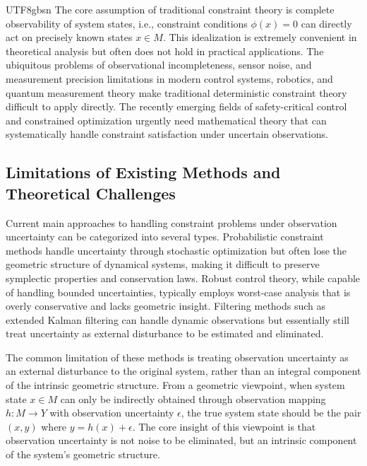 \documentclass[a4paper,12pt]{extarticle}
\theoremstyle{definition}
\begin{document}
\begin{CJK}{UTF8}{gbsn}
The core assumption of traditional constraint theory is complete observability of system states, i.e., constraint conditions $\phi(x) = 0$ can directly act on precisely known states $x \in M$. This idealization is extremely convenient in theoretical analysis but often does not hold in practical applications. The ubiquitous problems of observational incompleteness, sensor noise, and measurement precision limitations in modern control systems\cite{khalil2002nonlinear}, robotics\cite{murray1994mathematical}, and quantum measurement theory\cite{nielsen2000quantum} make traditional deterministic constraint theory difficult to apply directly. The recently emerging fields of safety-critical control\cite{ames2019control} and constrained optimization\cite{nocedal2006numerical} urgently need mathematical theory that can systematically handle constraint satisfaction under uncertain observations.

\subsection{Limitations of Existing Methods and Theoretical Challenges}

Current main approaches to handling constraint problems under observation uncertainty can be categorized into several types. Probabilistic constraint methods\cite{nemirovski2007convex} handle uncertainty through stochastic optimization but often lose the geometric structure of dynamical systems, making it difficult to preserve symplectic properties and conservation laws. Robust control theory\cite{zhou1996robust}, while capable of handling bounded uncertainties, typically employs worst-case analysis that is overly conservative and lacks geometric insight. Filtering methods such as extended Kalman filtering\cite{jazwinski1970stochastic} can handle dynamic observations but essentially still treat uncertainty as external disturbance to be estimated and eliminated.

The common limitation of these methods is treating observation uncertainty as an external disturbance to the original system, rather than an integral component of the intrinsic geometric structure. From a geometric viewpoint, when system state $x \in M$ can only be indirectly obtained through observation mapping $h: M \to Y$ with observation uncertainty $\epsilon$, the true system state should be the pair $(x, y)$ where $y = h(x) + \epsilon$. The core insight of this viewpoint is that observation uncertainty is not noise to be eliminated, but an intrinsic component of the system's geometric structure.


\end{CJK}
\end{document}
